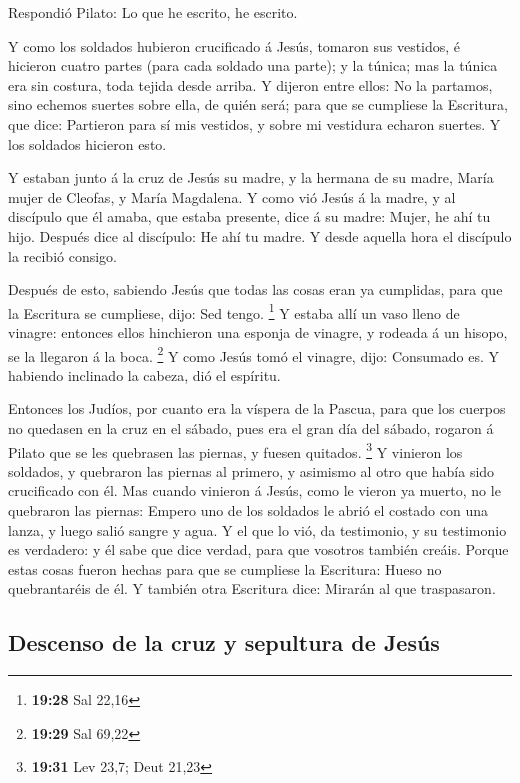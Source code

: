  Respondió Pilato: Lo que he escrito, he escrito.

 Y como los soldados hubieron crucificado á Jesús, tomaron
sus vestidos, é hicieron cuatro partes (para cada soldado una parte); y
la túnica; mas la túnica era sin costura, toda tejida desde arriba.
 Y dijeron entre ellos: No la partamos, sino echemos
suertes sobre ella, de quién será; para que se cumpliese la Escritura,
que dice: Partieron para sí mis vestidos, y sobre mi vestidura echaron
suertes. Y los soldados hicieron esto.

 Y estaban junto á la cruz de Jesús su madre, y la hermana
de su madre, María mujer de Cleofas, y María Magdalena.  Y
como vió Jesús á la madre, y al discípulo que él amaba, que estaba
presente, dice á su madre: Mujer, he ahí tu hijo.  Después
dice al discípulo: He ahí tu madre. Y desde aquella hora el discípulo la
recibió consigo.

 Después de esto, sabiendo Jesús que todas las cosas eran
ya cumplidas, para que la Escritura se cumpliese, dijo: Sed tengo.
\footnote{\textbf{19:28} Sal 22,16}  Y estaba allí un vaso
lleno de vinagre: entonces ellos hinchieron una esponja de vinagre, y
rodeada á un hisopo, se la llegaron á la boca. \footnote{\textbf{19:29}
  Sal 69,22}  Y como Jesús tomó el vinagre, dijo: Consumado
es. Y habiendo inclinado la cabeza, dió el espíritu.

 Entonces los Judíos, por cuanto era la víspera de la
Pascua, para que los cuerpos no quedasen en la cruz en el sábado, pues
era el gran día del sábado, rogaron á Pilato que se les quebrasen las
piernas, y fuesen quitados. \footnote{\textbf{19:31} Lev 23,7; Deut
  21,23}  Y vinieron los soldados, y quebraron las piernas
al primero, y asimismo al otro que había sido crucificado con él.
 Mas cuando vinieron á Jesús, como le vieron ya muerto, no
le quebraron las piernas:  Empero uno de los soldados le
abrió el costado con una lanza, y luego salió sangre y agua.
 Y el que lo vió, da testimonio, y su testimonio es
verdadero: y él sabe que dice verdad, para que vosotros también creáis.
 Porque estas cosas fueron hechas para que se cumpliese la
Escritura: Hueso no quebrantaréis de él.  Y también otra
Escritura dice: Mirarán al que traspasaron.

\hypertarget{descenso-de-la-cruz-y-sepultura-de-jesuxfas}{%
\subsection{Descenso de la cruz y sepultura de
Jesús}\label{descenso-de-la-cruz-y-sepultura-de-jesuxfas}}

